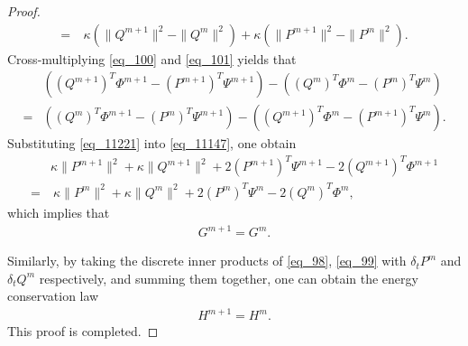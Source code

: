 \documentclass[preprint,compress,3p,10pt,fleqn]{elsarticle}
\numberwithin{equation}{section}
\begin{document}
\begin{proof}
\begin{align}
=&~\kappa (\|Q^{m+1}\|^2-\|Q^{m}\|^2)+\kappa (\|P^{m+1}\|^2-\|P^{m}\|^2).\label{eq_11147}
\end{align}
Cross-multiplying \eqref{eq_100} and \eqref{eq_101} yields that
\begin{align}\label{eq_11221}
&((Q^{m+1})^{T}\varPhi^{m+1}-(P^{m+1})^{T}\Psi^{m+1})-((Q^{m})^{T}\varPhi^{m}-(P^{m})^{T}\Psi^{m})\nonumber\\
=&((Q^{m})^{T}\varPhi^{m+1}-(P^{m})^{T}\Psi^{m+1})-((Q^{m+1})^{T}\varPhi^{m}-(P^{m+1})^{T}\Psi^{m}).
\end{align}
Substituting \eqref{eq_11221} into \eqref{eq_11147}, one obtain
\begin{align}
&\kappa \|P^{m+1}\|^2+\kappa \|Q^{m+1}\|^2+2(P^{m+1})^{T}\Psi^{m+1}-2(Q^{m+1})^{T}\varPhi^{m+1}\nonumber
\\=&~\kappa \|P^{m}\|^2+\kappa \|Q^{m}\|^2+2(P^{m})^{T}\Psi^{m}-2(Q^{m})^{T}\varPhi^{m},\label{eq_11155}
\end{align}
which implies that
\begin{align}\label{eq_11149}
G^{m+1}=G^{m} .
\end{align}

Similarly, by taking the discrete inner products of \eqref{eq_98}, \eqref{eq_99} with $\delta_t P^{m}$ and $\delta_t Q^{m}$ respectively, and summing them together, one can obtain the energy conservation law
\begin{align}\label{eq_11156}
H^{m+1}=H^{m}.
\end{align}
This proof is completed.
\end{proof}
\end{document}
